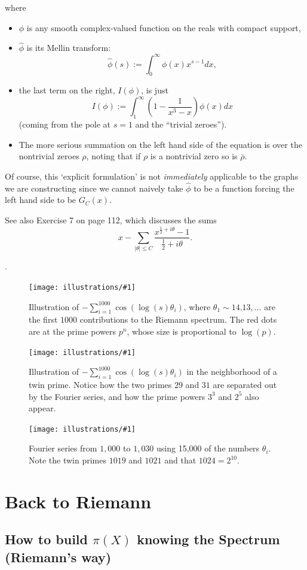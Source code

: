 \documentclass[openany]{book}
\newcommand{\ill}[3]{%
   \begin{figure}[H]%
   \vspace{-2ex}
   \centering%
   \texttt{[image: illustrations/\#1]}%
   \caption{#3}%
   \vspace{-2ex}
    \end{figure}}
\theoremstyle{plain}
\theoremstyle{definition}
\begin{document}
{{{{where \begin{itemize} \item $\phi$ is any smooth complex-valued
  function on the reals with compact support,\item ${\hat \phi}$ is
  its Mellin transform: $${\hat \phi}(s):=
  \int_0^{\infty}\phi(x)x^{s-1}dx,$$ \item the last term on the right,
  $I(\phi)$, is just
 $$I(\phi):= \int_1^{\infty}(1-{\frac{1}{x^3-x}})\phi(x)dx$$ (coming from the pole at $s=1$ and the ``trivial zeroes''). \item The more serious  summation on the left hand side of the equation is over the nontrivial zeroes $\rho$, noting that if $\rho$ is a nontrivial zero so is ${\bar \rho}$. \end{itemize}



Of course, this `explicit formulation' is not {\it immediately}
applicable to the graphs we are constructing since we cannot naively
take ${\hat \phi}$ to be a function forcing the left hand side to be
$G_C(x)$.

   See also Exercise 7 on page 112,  which discusses the sums $$x - \sum_{|\theta| \le C} {\frac{x^{{\frac{1}{2}} +i\theta}-1}{{\frac{1}{2}} +i\theta}}.$$}.


 \ill{phi_cos_sum_2_30_1000}{.8}{Illustration of $-\sum_{i=1}^{1000}
   \cos(\log(s)\theta_i)$, where $\theta_1 \sim 14.13, \ldots$ are the
   first $1000$ contributions to the Riemann spectrum.  The red dots
   are at the prime powers $p^n$, whose size is proportional to
   $\log(p)$.}

 \ill{phi_cos_sum_26_34_1000}{.8}{Illustration of $-\sum_{i=1}^{1000}
   \cos(\log(s)\theta_i)$ in the neighborhood of a twin prime.  Notice
   how the two primes $29$ and $31$ are separated out by the Fourier
   series, and how the prime powers $3^3$ and $2^5$ also appear.}

 \ill{phi_cos_sum_1010_1026_15000}{.7}{Fourier series from $1,000$ to
   $1,030$ using 15,000 of the numbers $\theta_i$.  Note the twin
   primes $1019$ and $1021$ and that $1024=2^{10}$.}


\part{Back to Riemann\label{part4}}


\chapter[Building $\pi(X)$ knowing the Spectrum]{How to build $\pi(X)$ knowing the Spectrum (Riemann's way)}


}}}
\end{document}
